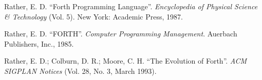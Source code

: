 \begin{description}
\begin{description}
	\item Rather, E. D.
		``Forth Programming Language''.
		\emph{Encyclopedia of Physical Science \& Technology} (Vol. 5).
		New York: Academic Press, 1987.

	\item Rather, E. D.
		``FORTH''.
		\emph{Computer Programming Management}.
		Auerbach Publishers, Inc., 1985.

	\item Rather, E. D.; Colburn, D. R.; Moore, C. H.
		``The Evolution of Forth''.
		\emph{ACM SIGPLAN Notices} (Vol. 28, No. 3, March 1993).
	\end{description}

\end{description}
